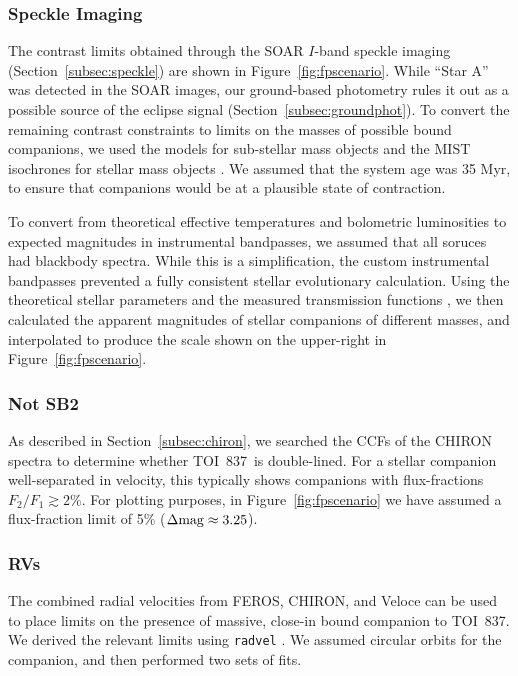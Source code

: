 \documentclass[12pt,twocolumn,tighten]{aastex63}
\newcommand{\tn}{TOI~837} %
\begin{document}
\subsubsection{Speckle Imaging}
The contrast limits obtained through the SOAR $I$-band speckle imaging
(Section~\ref{subsec:speckle}) are shown in
Figure~\ref{fig:fpscenario}.  While ``Star A'' was detected in the
SOAR images, our ground-based photometry rules it out as a possible
source of the eclipse signal (Section~\ref{subsec:groundphot}).  To
convert the remaining contrast constraints to limits on the masses of
possible bound companions, we used the
\citet{baraffe_evolutionary_2003} models for sub-stellar mass objects
and the MIST isochrones for stellar mass objects
\citep{paxton_modules_2011,paxton_modules_2013,paxton_modules_2015,dotter_mesa_2016,choi_mesa_2016}.
We assumed that the system age was 35 Myr, to ensure that companions
would be at a plausible state of contraction.

To convert from theoretical effective temperatures and bolometric
luminosities to expected magnitudes in instrumental bandpasses, we
assumed that all soruces had blackbody spectra.  While this is
a simplification, the custom instrumental bandpasses prevented a fully
consistent stellar evolutionary calculation.  Using the theoretical
stellar parameters and the measured transmission functions
\citep{tokovinin_ten_2018}, we then calculated the apparent magnitudes
of stellar companions of different masses, and interpolated
to produce the scale shown on the upper-right in
Figure~\ref{fig:fpscenario}.

\subsubsection{Not SB2}
As described in Section~\ref{subsec:chiron}, we searched the CCFs of
the CHIRON spectra to determine whether \tn\ is double-lined.  For a
stellar companion well-separated in velocity, this typically shows
companions with flux-fractions $F_2/F_1 \gtrsim 2\%$.  For plotting
purposes, in Figure~\ref{fig:fpscenario} we have assumed a
flux-fraction limit of 5\% ($\Delta {\rm mag} \approx 3.25$).

\subsubsection{RVs}
The combined radial velocities from FEROS, CHIRON, and Veloce can be
used to place limits on the presence of massive, close-in bound
companion to \tn.  We derived the relevant limits using
\texttt{radvel} \citep{fulton_radvel_2018}.  We assumed circular
orbits for the companion, and then performed two sets of fits.
\end{document}
